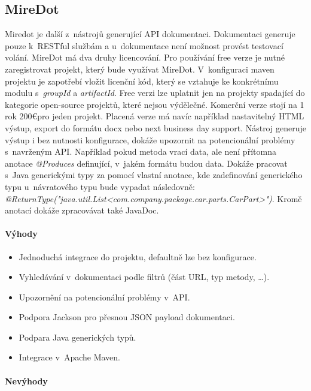\documentclass[11pt,twoside,a4paper]{book}
\begin{document}
\subsection{MireDot}

Miredot \cite{MiredotHome} je další z~nástrojů generující API dokumentaci. Dokumentaci
generuje pouze k~RESTful službám a u~dokumentace není možnost provést testovací
volání.
MireDot má dva druhy licencování. Pro používání free verze je nutné zaregistrovat 
projekt, který bude využívat MireDot. V~konfiguraci maven projektu je zapotřebí 
vložit licenční kód, který se vztahuje ke konkrétnímu modulu s~{\em groupId} a
{\em artifactId}.
Free verzi lze uplatnit jen na projekty spadající do kategorie open-source projektů, 
které nejsou výdělečné. Komerční verze stojí na 1 rok 200\euro pro jeden
projekt.
Placená verze má navíc například nastavitelný HTML výstup, export do formátu 
docx nebo next business day support. Nástroj generuje výstup i bez nutnosti 
konfigurace, dokáže upozornit na potencionální problémy s~navrženým API. Například 
pokud metoda vrací data, ale není přítomna anotace {\em @Produces} definující,
v~jakém formátu budou data. Dokáže pracovat s~Java generickými typy za pomocí
vlastní anotace, kde zadefinování generického typu u~návratového typu bude vypadat následovně: 
{\em @ReturnType("java.util.List<com.company.package.car.parts.CarPart>")}.
Kromě anotací dokáže zpracovávat také JavaDoc.

\paragraph{Výhody}

\begin{itemize}
  \item Jednoduchá integrace do projektu, defaultně lze bez konfigurace.
  \item Vyhledávání v~dokumentaci podle filtrů (část URL, typ metody, \ldots).
  \item Upozornění na potencionální problémy v~API.
  \item Podpora Jackson pro přesnou JSON payload dokumentaci.
  \item Podpara Java generických typů.
  \item Integrace v~Apache Maven.
\end{itemize}

\paragraph{Nevýhody}
\end{document}
